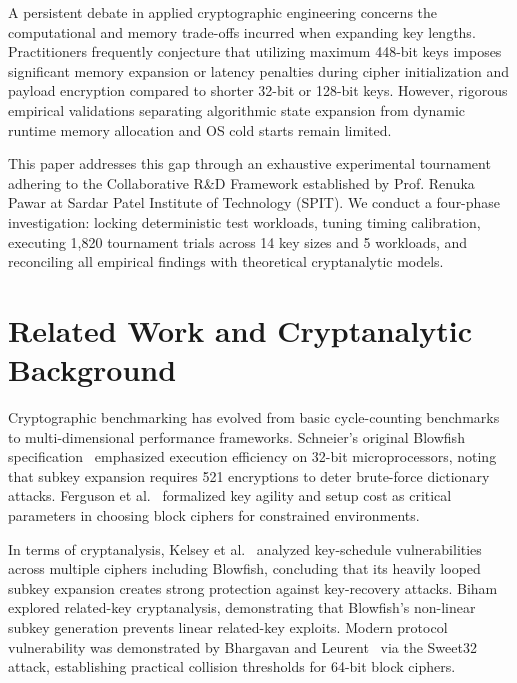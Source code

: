 \documentclass[conference]{IEEEtran}
\begin{document}
A persistent debate in applied cryptographic engineering concerns the computational and memory trade-offs incurred when expanding key lengths. Practitioners frequently conjecture that utilizing maximum 448-bit keys imposes significant memory expansion or latency penalties during cipher initialization and payload encryption compared to shorter 32-bit or 128-bit keys. However, rigorous empirical validations separating algorithmic state expansion from dynamic runtime memory allocation and OS cold starts remain limited.

This paper addresses this gap through an exhaustive experimental tournament adhering to the Collaborative R\&D Framework established by Prof. Renuka Pawar at Sardar Patel Institute of Technology (SPIT). We conduct a four-phase investigation: locking deterministic test workloads, tuning timing calibration, executing 1,820 tournament trials across 14 key sizes and 5 workloads, and reconciling all empirical findings with theoretical cryptanalytic models.

\section{Related Work and Cryptanalytic Background}
Cryptographic benchmarking has evolved from basic cycle-counting benchmarks to multi-dimensional performance frameworks. Schneier's original Blowfish specification~\cite{schneier1993blowfish} emphasized execution efficiency on 32-bit microprocessors, noting that subkey expansion requires 521 encryptions to deter brute-force dictionary attacks. Ferguson et al.~\cite{ferguson2010cryptography} formalized key agility and setup cost as critical parameters in choosing block ciphers for constrained environments.

In terms of cryptanalysis, Kelsey et al.~\cite{kelsey1996keyschedule} analyzed key-schedule vulnerabilities across multiple ciphers including Blowfish, concluding that its heavily looped subkey expansion creates strong protection against key-recovery attacks. Biham~\cite{biham1994relatedkey} explored related-key cryptanalysis, demonstrating that Blowfish's non-linear subkey generation prevents linear related-key exploits. Modern protocol vulnerability was demonstrated by Bhargavan and Leurent~\cite{bhargavan2016sweet32} via the Sweet32 attack, establishing practical collision thresholds for 64-bit block ciphers.
\end{document}
